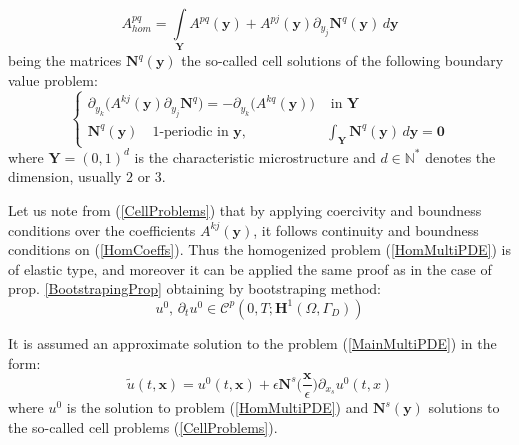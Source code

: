 \begin{equation}
    \label{HomCoeffs}
    A^{pq}_{hom} = \int \limits_{\mathbf{Y}} A^{pq}(\mathbf{y}) + A^{pj} (\mathbf{y}) \partial_{y_j} \mathbf{N}^q (\mathbf{y}) \, d\mathbf{y}
\end{equation}
being the matrices $\mathbf{N}^q(\mathbf{y})$ the so-called cell solutions of the following boundary value problem:
\begin{equation}
    \label{CellProblems}
    \left \{
    \begin{array}{cc}
        \partial_{y_k} \big( A^{kj}(\mathbf{y}) \partial_{y_j} \mathbf{N}^q \big) = -\partial_{y_k} \big( A^{kq}(\mathbf{y}) \big) & \text{ in } \mathbf{Y} \\
        \mathbf{N}^q(\mathbf{y}) \quad 1\text{-periodic in } \mathbf{y}, & \int_{\mathbf{Y}}  \mathbf{N}^q (\mathbf{y}) \, d\mathbf{y} = \mathbf{0}
    \end{array}
    \right .
\end{equation}
where $\mathbf{Y} = (0,1)^d$ is the characteristic microstructure and $d \in \mathbb{N}^*$ denotes the dimension, usually $2$ or $3$.\\

\begin{rem}
 Let us note from (\ref{CellProblems}) that by applying  coercivity and boundness conditions over the coefficients $A^{kj}(\mathbf{y})$, it follows continuity and boundness conditions on (\ref{HomCoeffs}). Thus the homogenized problem (\ref{HomMultiPDE}) is of elastic type, and moreover it can be applied the same proof as in the case of prop. \ref{BootstrapingProp} obtaining by bootstraping method:
 \begin{equation*}
     u^0, \, \partial_{t} u^0 \in \mathcal{C}^p (0,T; \mathbf{H}^1(\Omega, \Gamma_D))
 \end{equation*}
\end{rem}

It is assumed an approximate solution to the problem (\ref{MainMultiPDE}) in the form:
\begin{equation}
    \label{Asymptotic}
    \tilde{u}(t,\mathbf{x}) = u^0 (t,\mathbf{x}) + \epsilon \mathbf{N}^{s} \big(\frac{\mathbf{x}}{\epsilon} \big) \partial_{x_s} u^0(t,x)
\end{equation}
where $u^0$ is the solution to problem (\ref{HomMultiPDE}) and $\mathbf{N}^{s} (\mathbf{y})$ solutions to the so-called cell problems (\ref{CellProblems}).


